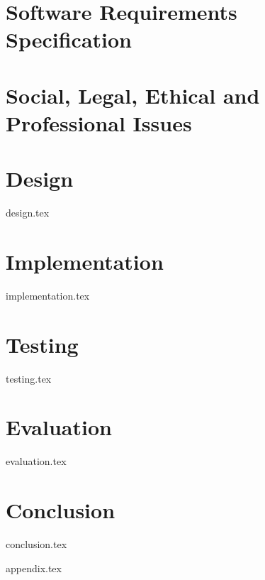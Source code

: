 \documentclass[a4paper, 12pt, oneside]{book}
\begin{document}
\chapter{Software Requirements Specification}

\chapter{Social, Legal, Ethical and Professional Issues}

\chapter{Design}
{design.tex}

\chapter{Implementation}
{implementation.tex}

\chapter{Testing}
{testing.tex}

\chapter{Evaluation}
{evaluation.tex}

\chapter{Conclusion}
{conclusion.tex}

\backmatter

\setcounter{page}{1} %



\setlength{} %
\printbibliography[heading=bibintoc, title = {References}]



\appendix
\renewcommand{\thechapter}{\alph{chapter}}
{appendix.tex}
\end{document}

